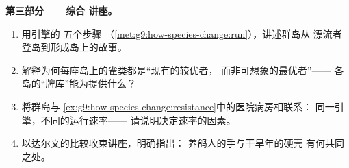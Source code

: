 \begin{problem}
\medskip\noindent\textbf{第三部分——综合
讲座。}
\begin{enumerate}[resume]
  \item 用引擎的
        五个步骤
        （\cref{met:g9:how-species-change:run}），讲述群岛从
        漂流者登岛到形成岛上的故事。
  \item 解释为何每座岛上的雀类都是“现有的较优者，
        而非可想象的最优者”——
        各岛的“牌库”能为提供什么？
  \item 将群岛与
        \cref{ex:g9:how-species-change:resistance}中的医院病房相联系：
        同一引擎，不同的运行速率——
        请说明决定速率的因素。
  \item 以达尔文的比较收束讲座，明确指出：
        养鸽人的手与干旱年的硬壳
        有何共同之处。
\end{enumerate}
\end{problem}
